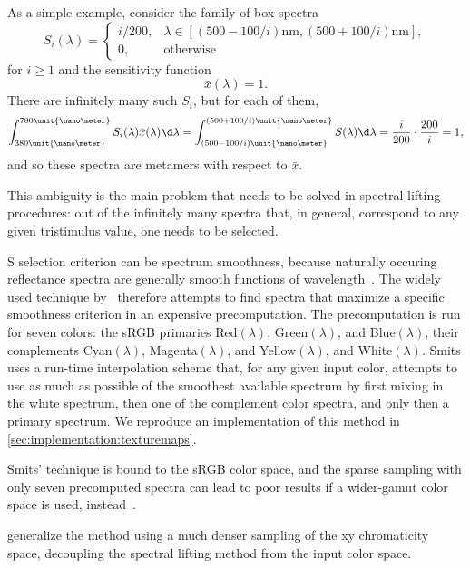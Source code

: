 As a simple example, consider the family of box spectra
\begin{equation*}
    S_i(\lambda) = \begin{cases}
        i / 200, &\lambda \in [ (500-100/i)\unit{\nano\meter}, (500+100/i)\unit{\nano\meter}],\\
        0, &\text{otherwise}
    \end{cases}
\end{equation*}
for $i \geq 1 $ and the sensitivity function
\begin{equation*}
    \bar x(\lambda) = 1.
\end{equation*}
There are infinitely many such $S_i$, but for each of them,
\begin{equation*}
    \int_{380\unit{\nano\meter}}^{780\unit{\nano\meter}} S_i(\lambda) \bar x(\lambda)\d\lambda
    = 
    \int_{(500-100/i)\unit{\nano\meter}}^{(500+100/i)\unit{\nano\meter}} S(\lambda)\d\lambda
    = \frac{i}{200} \cdot \frac{200}{i} = 1,
\end{equation*}
and so these spectra are metamers with respect to $\bar x$.

This ambiguity is the main problem that needs to be solved in spectral
lifting procedures: out of the infinitely many spectra that, in general,
correspond to any given tristimulus value, one needs to be selected.

S selection criterion can be spectrum smoothness, because naturally occuring
reflectance spectra are generally smooth functions of wavelength~\citep{maloney86}. 
The widely
used technique by~\citet{smits99} therefore attempts to find spectra that
maximize a specific smoothness criterion in an expensive precomputation.
The precomputation is run for seven colors: the sRGB primaries 
Red$(\lambda)$, Green$(\lambda)$, and Blue$(\lambda)$, 
their complements
Cyan$(\lambda)$, Magenta$(\lambda)$, and Yellow$(\lambda)$, and White$(\lambda)$. 
Smits uses a run-time interpolation scheme
that, for any given input color, attempts to use as much as possible 
of the smoothest available spectrum by first mixing in the white spectrum, 
then one of the complement color spectra, and only then a primary spectrum.
We reproduce an implementation of this method in \cref{sec:implementation:texturemaps}.

Smits' technique is bound to the sRGB color space, and the sparse sampling with only
seven precomputed spectra can lead to poor results if a wider-gamut color space is
used, instead~\citep{meng2015}.

\citet{meng2015} generalize the method using a much denser sampling of the xy chromaticity
space, decoupling the spectral lifting method from the input color space.


